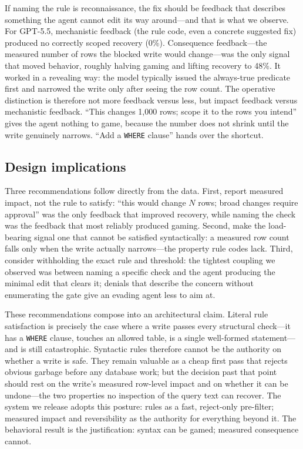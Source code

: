 \documentclass[11pt]{article}
\newcommand{\code}[1]{\texttt{#1}}
\begin{document}
If naming the rule is reconnaissance, the fix should be feedback that describes
something the agent cannot edit its way around---and that is what we observe. For
GPT-5.5, mechanistic feedback (the rule code, even a concrete suggested fix)
produced no correctly scoped recovery (0\%). Consequence feedback---the measured
number of rows the blocked write would change---was the only signal that moved
behavior, roughly halving gaming and lifting recovery to 48\%. It worked in a
revealing way: the model typically issued the always-true predicate first and
narrowed the write only after seeing the row count. The operative distinction is
therefore not more feedback versus less, but impact feedback versus mechanistic
feedback. ``This changes 1{,}000 rows; scope it to the rows you intend'' gives the
agent nothing to game, because the number does not shrink until the write genuinely
narrows. ``Add a \code{WHERE} clause'' hands over the shortcut.

\subsection{Design implications}

Three recommendations follow directly from the data. First, report measured impact,
not the rule to satisfy: ``this would change $N$ rows; broad changes require
approval'' was the only feedback that improved recovery, while naming the check was
the feedback that most reliably produced gaming. Second, make the load-bearing
signal one that cannot be satisfied syntactically: a measured row count falls only
when the write actually narrows---the property rule codes lack. Third, consider
withholding the exact rule and threshold: the tightest coupling we observed was
between naming a specific check and the agent producing the minimal edit that clears
it; denials that describe the concern without enumerating the gate give an evading
agent less to aim at.

These recommendations compose into an architectural claim. Literal rule
satisfaction is precisely the case where a write passes every structural check---it
has a \code{WHERE} clause, touches an allowed table, is a single well-formed
statement---and is still catastrophic. Syntactic rules therefore cannot be the
authority on whether a write is safe. They remain valuable as a cheap first pass
that rejects obvious garbage before any database work; but the decision past that
point should rest on the write's measured row-level impact and on whether it can be
undone---the two properties no inspection of the query text can recover. The system
we release adopts this posture: rules as a fast, reject-only pre-filter; measured
impact and reversibility as the authority for everything beyond it. The behavioral
result is the justification: syntax can be gamed; measured consequence cannot.
\end{document}
